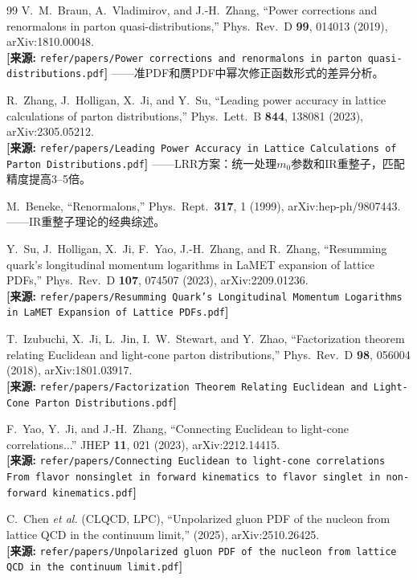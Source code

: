 \documentclass[12pt,a4paper]{ctexart}
\theoremstyle{definition}
\begin{document}
\begin{thebibliography}{99}
V.~M.~Braun, A.~Vladimirov, and J.-H.~Zhang,
``Power corrections and renormalons in parton quasi-distributions,''
Phys.\ Rev.\ D \textbf{99}, 014013 (2019), arXiv:1810.00048.
\\\textbf{[来源:} \texttt{refer/papers/Power corrections and renormalons in parton quasi-distributions.pdf}\textbf{]}
——准PDF和赝PDF中幂次修正函数形式的差异分析。

R.~Zhang, J.~Holligan, X.~Ji, and Y.~Su,
``Leading power accuracy in lattice calculations of parton distributions,''
Phys.\ Lett.\ B \textbf{844}, 138081 (2023), arXiv:2305.05212.
\\\textbf{[来源:} \texttt{refer/papers/Leading Power Accuracy in Lattice Calculations of Parton Distributions.pdf}\textbf{]}
——LRR方案：统一处理$m_0$参数和IR重整子，匹配精度提高3--5倍。

M.~Beneke,
``Renormalons,''
Phys.\ Rept.\ \textbf{317}, 1 (1999), arXiv:hep-ph/9807443.
——IR重整子理论的经典综述。

Y.~Su, J.~Holligan, X.~Ji, F.~Yao, J.-H.~Zhang, and R.~Zhang,
``Resumming quark's longitudinal momentum logarithms in LaMET expansion of lattice PDFs,''
Phys.\ Rev.\ D \textbf{107}, 074507 (2023), arXiv:2209.01236.
\\\textbf{[来源:} \texttt{refer/papers/Resumming Quark's Longitudinal Momentum Logarithms in LaMET Expansion of Lattice PDFs.pdf}\textbf{]}

T.~Izubuchi, X.~Ji, L.~Jin, I.~W.~Stewart, and Y.~Zhao,
``Factorization theorem relating Euclidean and light-cone parton distributions,''
Phys.\ Rev.\ D \textbf{98}, 056004 (2018), arXiv:1801.03917.
\\\textbf{[来源:} \texttt{refer/papers/Factorization Theorem Relating Euclidean and Light-Cone Parton Distributions.pdf}\textbf{]}

F.~Yao, Y.~Ji, and J.-H.~Zhang,
``Connecting Euclidean to light-cone correlations...''
JHEP \textbf{11}, 021 (2023), arXiv:2212.14415.
\\\textbf{[来源:} \texttt{refer/papers/Connecting Euclidean to light-cone correlations From flavor nonsinglet in forward kinematics to flavor singlet in non-forward kinematics.pdf}\textbf{]}

C.~Chen \textit{et al.} (CLQCD, LPC),
``Unpolarized gluon PDF of the nucleon from lattice QCD in the continuum limit,''
(2025), arXiv:2510.26425.
\\\textbf{[来源:} \texttt{refer/papers/Unpolarized gluon PDF of the nucleon from lattice QCD in the continuum limit.pdf}\textbf{]}


\end{thebibliography}
\end{document}
